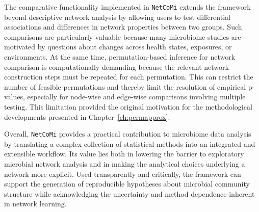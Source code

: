 The comparative functionality implemented in \texttt{NetCoMi} extends the framework beyond descriptive network analysis by allowing users to test differential associations and differences in network properties between two groups. Such comparisons are particularly valuable because many microbiome studies are motivated by questions about changes across health states, exposures, or environments. At the same time, permutation-based inference for network comparison is computationally demanding because the relevant network construction steps must be repeated for each permutation. This can restrict the number of feasible permutations and thereby limit the resolution of empirical p-values, especially for node-wise and edge-wise comparisons involving multiple testing. This limitation provided the original motivation for the methodological developments presented in Chapter~\ref{ch:permapprox}.

Overall, \texttt{NetCoMi} provides a practical contribution to microbiome data analysis by translating a complex collection of statistical methods into an integrated and extensible workflow. Its value lies both in lowering the barrier to exploratory microbial network analysis and in making the analytical choices underlying a network more explicit. Used transparently and critically, the framework can support the generation of reproducible hypotheses about microbial community structure while acknowledging the uncertainty and method dependence inherent in network learning.
